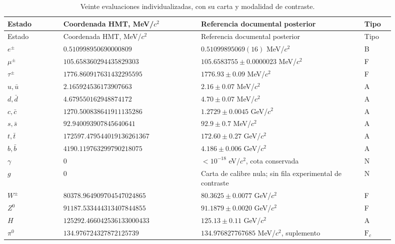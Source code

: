 \begingroup
\small
\setlength{\tabcolsep}{3pt}
\begin{longtable}{p{0.13\linewidth}p{0.32\linewidth}p{0.38\linewidth}p{0.07\linewidth}}
\caption{Veinte evaluaciones individualizadas, con su carta y modalidad de contraste.}
\label{tab:vi-evaluaciones-veinte}\\
\toprule
Estado & Coordenada HMT, MeV/\(c^2\) & Referencia documental posterior & Tipo\\
\midrule
\endfirsthead
\toprule
Estado & Coordenada HMT, MeV/\(c^2\) & Referencia documental posterior & Tipo\\
\midrule
\endhead
\bottomrule
\endfoot
\(e^\pm\) & \(0.510998950\allowbreak690000809\) & \(0.51099895069(16)\) MeV/\(c^2\) & B\\
\(\mu^\pm\) & \(105.658360294\allowbreak435829303\) & \(105.6583755\pm0.0000023\) MeV/\(c^2\) & F\\
\(\tau^\pm\) & \(1776.860917631\allowbreak432295595\) & \(1776.93\pm0.09\) MeV/\(c^2\) & F\\
\(u,\bar u\) & \(2.165924536\allowbreak173907663\) & \(2.16\pm0.07\) MeV/\(c^2\) & A\\
\(d,\bar d\) & \(4.679550162\allowbreak948874172\) & \(4.70\pm0.07\) MeV/\(c^2\) & A\\
\(c,\bar c\) & \(1270.500838641\allowbreak911135286\) & \(1.2729\pm0.0045\) GeV/\(c^2\) & A\\
\(s,\bar s\) & \(92.940093907\allowbreak845640641\) & \(92.9\pm0.7\) MeV/\(c^2\) & A\\
\(t,\bar t\) & \(172597.479544019\allowbreak136261367\) & \(172.60\pm0.27\) GeV/\(c^2\) & A\\
\(b,\bar b\) & \(4190.119763299\allowbreak790218075\) & \(4.186\pm0.006\) GeV/\(c^2\) & A\\
\(\gamma\) & \(0\) & \(<10^{-18}\) eV/\(c^2\), cota conservada & N\\
\(g\) & \(0\) & Carta de calibre nula; sin fila experimental de contraste & N\\
\(W^\pm\) & \(80378.964909704\allowbreak547024865\) & \(80.3625\pm0.0077\) GeV/\(c^2\) & F\\
\(Z^0\) & \(91187.533444313\allowbreak407844855\) & \(91.1879\pm0.0020\) GeV/\(c^2\) & F\\
\(H\) & \(125292.466042536\allowbreak133000433\) & \(125.13\pm0.11\) GeV/\(c^2\) & A\\
\(\pi^0\) & \(134.976724327\allowbreak872125739\) & \(134.976827767685\) MeV/\(c^2\), suplemento & \(\mathrm F_c\)\\

\end{longtable}
